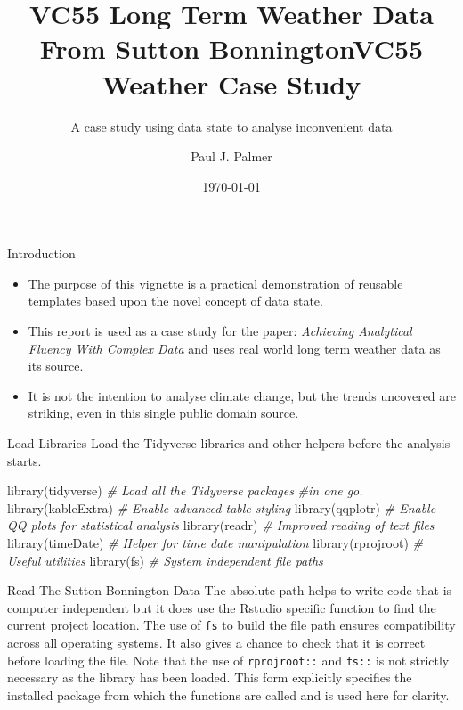 \documentclass[
  ignorenonframetext,
]{beamer}
\title[ VC55 Weather Case Study]{VC55 Long Term Weather Data From Sutton Bonnington} %
\subtitle{A case study using data state to analyse inconvenient data}
\institute[LU] %
{
    Visiting Fellow \\
    Loughborough University \\
    \copyright~P.J.~Palmer~2022
    
    
    
}
\author{}
\date{\vspace{-2.5em}\today} %
\title{VC55 Weather Case Study}
\author{Paul J. Palmer}
\date{}
\newenvironment{Shaded}{\begin{snugshade}}{\end{snugshade}}
\newcommand{\CommentTok}[1]{\textcolor[rgb]{0.56,0.35,0.01}{\textit{#1}}}
\newcommand{\FunctionTok}[1]{\textcolor[rgb]{0.00,0.00,0.00}{#1}}
\newcommand{\NormalTok}[1]{#1}
\providecommand{\tightlist}{%
  \setlength{\itemsep}{0pt}\setlength{\parskip}{0pt}}
\begin{document}
\frame{\titlepage}

\begin{frame}{Introduction}
\protect\hypertarget{introduction}{}
\begin{itemize}
\tightlist
\item
  The purpose of this vignette is a practical demonstration of reusable
  templates based upon the novel concept of data state.
\item
  This report is used as a case study for the paper: \emph{Achieving
  Analytical Fluency With Complex Data} and uses real world long term
  weather data as its source.
\item
  It is not the intention to analyse climate change, but the trends
  uncovered are striking, even in this single public domain source.
\end{itemize}
\end{frame}

\begin{frame}[fragile]{Load Libraries}
\protect\hypertarget{load-libraries}{}
Load the Tidyverse libraries and other helpers before the analysis
starts.

\begin{Shaded}
\begin{Highlighting}[]
\FunctionTok{library}\NormalTok{(tidyverse) }\CommentTok{\# Load all the Tidyverse packages }
\CommentTok{\#in one go.}
\FunctionTok{library}\NormalTok{(kableExtra) }\CommentTok{\# Enable advanced table styling}
\FunctionTok{library}\NormalTok{(qqplotr) }\CommentTok{\# Enable QQ plots for statistical analysis}
\FunctionTok{library}\NormalTok{(readr) }\CommentTok{\# Improved reading of text files}
\FunctionTok{library}\NormalTok{(timeDate) }\CommentTok{\# Helper for time date manipulation}
\FunctionTok{library}\NormalTok{(rprojroot) }\CommentTok{\# Useful utilities}
\FunctionTok{library}\NormalTok{(fs) }\CommentTok{\# System independent file paths}
\end{Highlighting}
\end{Shaded}
\end{frame}

\begin{frame}[fragile]{Read The Sutton Bonnington Data}
\protect\hypertarget{read-the-sutton-bonnington-data}{}
The absolute path helps to write code that is computer independent but
it does use the Rstudio specific function to find the current project
location. The use of \texttt{fs} to build the file path ensures
compatibility across all operating systems. It also gives a chance to
check that it is correct before loading the file. Note that the use of
\texttt{rprojroot::} and \texttt{fs::} is not strictly necessary as the
library has been loaded. This form explicitly specifies the installed
package from which the functions are called and is used here for
clarity.
\end{frame}
\end{document}
